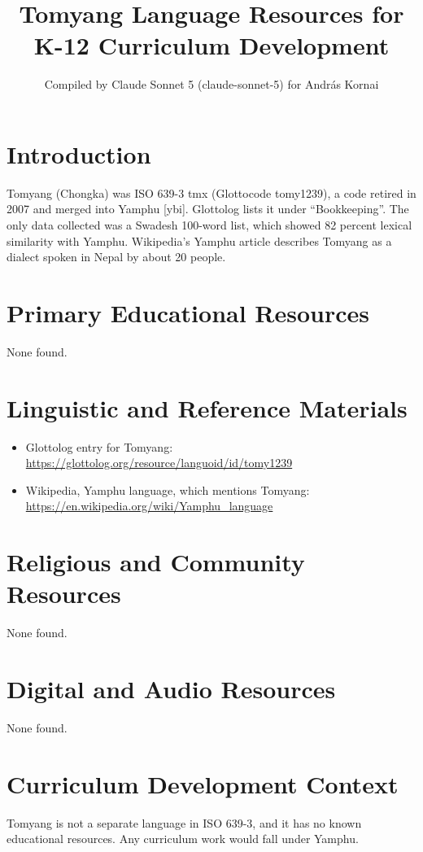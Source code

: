 \documentclass[12pt]{article}
\title{Tomyang Language Resources for K-12 Curriculum Development}
\author{Compiled by Claude Sonnet 5 (claude-sonnet-5) for Andr\'as Kornai}
\date{}
\begin{document}
\maketitle

\section{Introduction}
Tomyang (Chongka) was ISO 639-3 tmx (Glottocode tomy1239), a code retired in 2007 and merged into Yamphu [ybi]. Glottolog lists it under ``Bookkeeping''. The only data collected was a Swadesh 100-word list, which showed 82 percent lexical similarity with Yamphu. Wikipedia's Yamphu article describes Tomyang as a dialect spoken in Nepal by about 20 people.

\section{Primary Educational Resources}
None found.

\section{Linguistic and Reference Materials}
\begin{itemize}
\item Glottolog entry for Tomyang: \url{https://glottolog.org/resource/languoid/id/tomy1239}
\item Wikipedia, Yamphu language, which mentions Tomyang: \url{https://en.wikipedia.org/wiki/Yamphu_language}
\end{itemize}

\section{Religious and Community Resources}
None found.

\section{Digital and Audio Resources}
None found.

\section{Curriculum Development Context}
Tomyang is not a separate language in ISO 639-3, and it has no known educational resources. Any curriculum work would fall under Yamphu.
\end{document}
